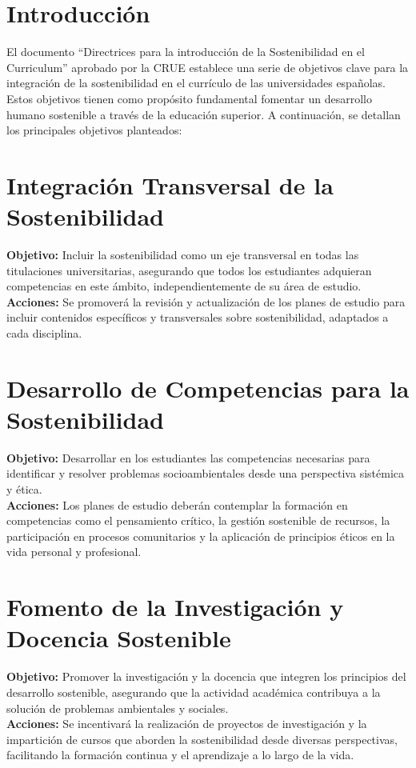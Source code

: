 
\section{Introducción}
El documento ``Directrices para la introducción de la Sostenibilidad en el Curriculum'' aprobado por la CRUE establece una serie de objetivos clave para la integración de la sostenibilidad en el currículo de las universidades españolas. Estos objetivos tienen como propósito fundamental fomentar un desarrollo humano sostenible a través de la educación superior. A continuación, se detallan los principales objetivos planteados:

\section{Integración Transversal de la Sostenibilidad}
\textbf{Objetivo:} Incluir la sostenibilidad como un eje transversal en todas las titulaciones universitarias, asegurando que todos los estudiantes adquieran competencias en este ámbito, independientemente de su área de estudio.\\
\textbf{Acciones:} Se promoverá la revisión y actualización de los planes de estudio para incluir contenidos específicos y transversales sobre sostenibilidad, adaptados a cada disciplina.

\section{Desarrollo de Competencias para la Sostenibilidad}
\textbf{Objetivo:} Desarrollar en los estudiantes las competencias necesarias para identificar y resolver problemas socioambientales desde una perspectiva sistémica y ética.\\
\textbf{Acciones:} Los planes de estudio deberán contemplar la formación en competencias como el pensamiento crítico, la gestión sostenible de recursos, la participación en procesos comunitarios y la aplicación de principios éticos en la vida personal y profesional.

\section{Fomento de la Investigación y Docencia Sostenible}
\textbf{Objetivo:} Promover la investigación y la docencia que integren los principios del desarrollo sostenible, asegurando que la actividad académica contribuya a la solución de problemas ambientales y sociales.\\
\textbf{Acciones:} Se incentivará la realización de proyectos de investigación y la impartición de cursos que aborden la sostenibilidad desde diversas perspectivas, facilitando la formación continua y el aprendizaje a lo largo de la vida.

